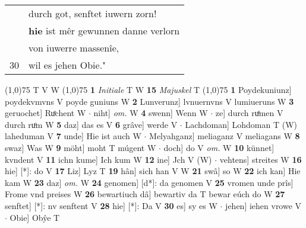 \documentclass[8pt,a4paper,notitlepage]{article}
\begin{document}
\begin{table}[ht]
\begin{minipage}[t]{0.5\linewidth}
\begin{tabular}{rl}
 & durch got, senftet iuwern zorn!\\ 
 & \textbf{hie} ist mêr gewunnen danne verlorn\\ 
 & von iuwerre massenîe,\\ 
30 & wil es jehen Obie."\\ 
\end{tabular}
\scriptsize
\line(1,0){75} \newline
T V W \newline
\line(1,0){75} \newline
\textbf{1} \textit{Initiale} T W  \textbf{15} \textit{Majuskel} T  \newline
\line(1,0){75} \newline
\textbf{1} Poydekuniunz] poydekvmvns V poyde guniuns W \textbf{2} Lunverunz] lvnuernvns V lumiueruns W \textbf{3} geruochet] Ruͦchent W  $\cdot$ niht] \textit{om.} W \textbf{4} swenn] Wenn W  $\cdot$ ze] durch ruͤmen V durch ruͦm W \textbf{5} daz] das es V \textbf{6} grâve] werde V  $\cdot$ Lachdoman] Lohdoman T (W) laheduman V \textbf{7} unde] Hie ist auch W  $\cdot$ Melyahganz] meliaganz V meliagans W \textbf{8} swaz] Was W \textbf{9} möht] moht T múgent W  $\cdot$ doch] do V \textit{om.} W \textbf{10} künnet] kvndent V \textbf{11} ichn kume] Ich kum W \textbf{12} ine] Jch V (W)  $\cdot$ vehtens] streites W \textbf{16} hie] [*]: do V \textbf{17} Liz] Lyz T \textbf{19} hân] sich han V W \textbf{21} swâ] so W \textbf{22} ich kan] Hie kam W \textbf{23} daz] \textit{om.} W \textbf{24} genomen] [d*]: da genomen V \textbf{25} vromen unde prîs] Frome vnd preises W \textbf{26} bewartiuch dâ] bewartiv da T bewar eúch do W \textbf{27} senftet] [*]: nv senftent V \textbf{28} hie] [*]: Da V \textbf{30} es] sy es W  $\cdot$ jehen] iehen vrowe V  $\cdot$ Obie] Obŷe T \newline
\end{minipage}
\end{table}
\end{document}

